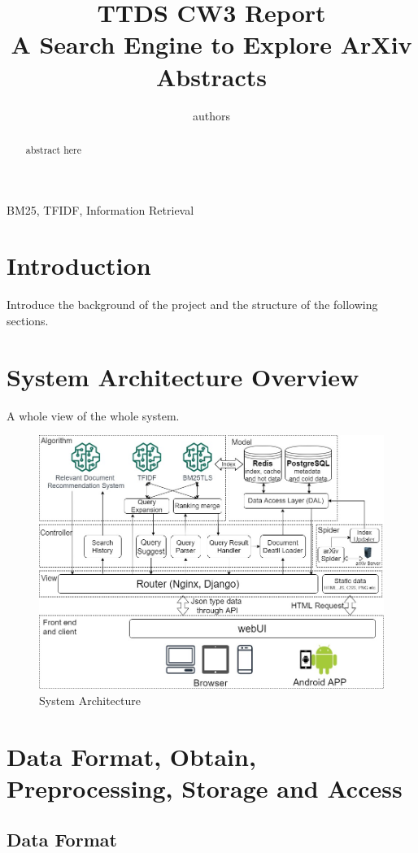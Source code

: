 \documentclass[conference]{IEEEtran}
\begin{document}
\title{TTDS CW3 Report\\
{A Search Engine to Explore ArXiv Abstracts}}


\author{authors}

\maketitle

\begin{abstract}
abstract here
\end{abstract}

\begin{IEEEkeywords}
BM25, TFIDF, Information Retrieval
\end{IEEEkeywords}

\section{Introduction}
Introduce the background of the project and the structure of the following sections.

\section{System Architecture Overview}
A whole view of the whole system.
\begin{figure}[h]
\centering
\includegraphics[width=3.5 in]{fig/structure} 
\caption{System Architecture}
\label{SystemArchitecture}
\end{figure}

\section{Data Format, Obtain, Preprocessing, Storage and Access}
\subsection{Data Format}
\end{document}
